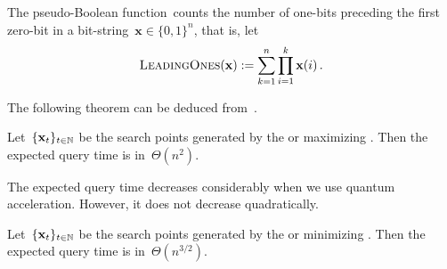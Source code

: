 The pseudo-Boolean function~\leadingones counts the number of one-bits preceding the first zero-bit in a bit-string~$\mathbf{x}\in\{0,1\}^n$, that is, let
\begin{equation}
\textsc{LeadingOnes}(\mathbf{x}):=\sum_{k=1}^n\prod_{i=1}^k \mathbf{x}(i)\,.
\end{equation}


The following theorem can be deduced from~\cite{DJWoneone}.
\begin{theorem}
Let~$\{\mathbf{x}_t\}_{t\in\mathbb{N}}$ be the search points generated by the \ooea or \rls maximizing \leadingones.  Then the expected query time is in~$\Theta(n^2)$.
\end{theorem}

The expected query time decreases considerably when we use quantum acceleration. However, it does not decrease quadratically.
\begin{theorem}
Let~$\{\mathbf{x}_t\}_{t\in\mathbb{N}}$ be the search points generated by the \qooea or \qrls minimizing \leadingones. Then the expected query time is in~$\Theta(n^{3/2})$.
\end{theorem}

